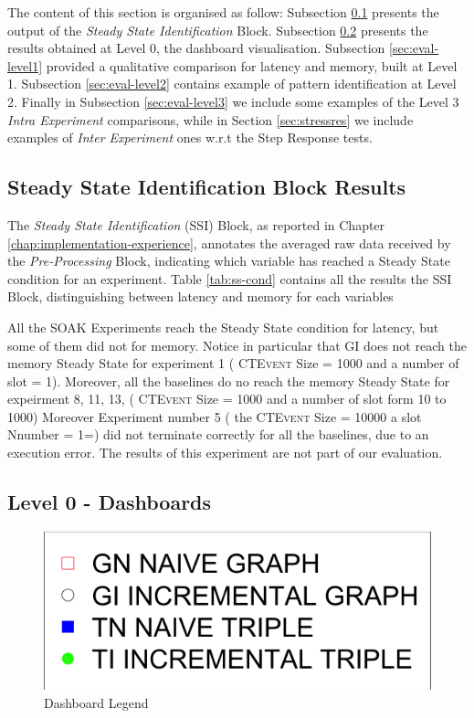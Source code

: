 The content of this section is organised as follow: 
Subsection \ref{sec:eval-ssib} presents the output of the \textit{Steady State Identification} Block. 
Subsection \ref{sec:eval-level0} presents the results obtained at Level 0, the dashboard visualisation.  
Subsection \ref{sec:eval-level1} provided a qualitative comparison for latency and memory, built at Level 1. 
Subsection \ref{sec:eval-level2} contains example of pattern identification at Level 2. 
Finally in Subsection \ref{sec:eval-level3} we include some examples of the Level 3 \textit{Intra Experiment }comparisons, while in Section \ref{sec:stressres} we include examples of \textit{Inter Experiment }ones w.r.t the Step Response tests.


\subsection{Steady State Identification Block Results}\label{sec:eval-ssib}

The \textit{Steady State Identification} (SSI) Block, as reported in Chapter \ref{chap:implementation-experience}, annotates the averaged raw data received by the \textit{Pre-Processing} Block, indicating which variable has reached a Steady State condition for an experiment. Table \ref{tab:ss-cond} contains all the results the SSI Block, distinguishing between latency and memory for each variables





All the SOAK Experiments reach the Steady State condition for latency, but some of them did not for memory. Notice in particular that GI does not reach the memory Steady State for experiment 1 (  \textsc{CTEvent}  Size = 1000 and a number of slot = 1). Moreover, all the baselines do no reach the memory  Steady State for expeirment 8, 11, 13, ( \textsc{CTEvent}  Size = 1000 and a number of slot form 10 to 1000)  Moreover Experiment number 5 ( the \textsc{CTEvent} Size = 10000 a slot Nnumber = 1=) did not terminate correctly for all the baselines, due to an execution error. The results of this experiment are not part of our evaluation.

\subsection{Level 0 - Dashboards}\label{sec:eval-level0}

\begin{figure}[tbh]
	\centering
	\includegraphics[width=0.25\linewidth]{images/dashboard-legend}	
	\caption{Dashboard Legend} 
	\label{fig:dashboard-legend}
\end{figure}

